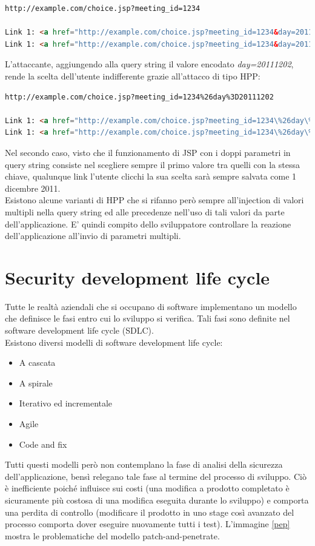 \begin{lstlisting}[language=HTML]
http://example.com/choice.jsp?meeting_id=1234

Link 1: <a href="http://example.com/choice.jsp?meeting_id=1234&day=20111201">1 dicembre 2011</a>
Link 1: <a href="http://example.com/choice.jsp?meeting_id=1234&day=20111202">2 dicembre 2011</a>
\end{lstlisting}

L'attaccante, aggiungendo alla query string il valore encodato \emph{day=20111202}, rende la scelta dell'utente indifferente grazie all'attacco di tipo HPP:\\

\begin{lstlisting}[language=HTML]
http://example.com/choice.jsp?meeting_id=1234%26day%3D20111202

Link 1: <a href="http://example.com/choice.jsp?meeting_id=1234\%26day\%3D20111202&day=20111201">1 dicembre 2011</a>
Link 1: <a href="http://example.com/choice.jsp?meeting_id=1234\%26day\%3D20111202&day=20111202">2 dicembre 2011</a>
\end{lstlisting}

Nel secondo caso, visto che il funzionamento di JSP con i doppi parametri in query string consiste nel scegliere sempre il primo valore tra quelli con la stessa chiave, qualunque link l'utente clicchi la sua scelta sarà sempre salvata come 1 dicembre 2011.\\
Esistono alcune varianti di HPP che si rifanno però sempre all'injection di valori multipli nella query string ed alle precedenze nell'uso di tali valori da parte dell'applicazione. E' quindi compito dello sviluppatore controllare la reazione dell'applicazione all'invio di parametri multipli.

\section{Security development life cycle}
Tutte le realtà aziendali che si occupano di software implementano un modello che definisce le fasi entro cui lo sviluppo si verifica. Tali fasi sono definite nel software development life cycle (SDLC).\\
Esistono diversi modelli di software development life cycle:
\begin{itemize}
\item A cascata
\item A spirale
\item Iterativo ed incrementale
\item Agile
\item Code and fix
\end{itemize}
Tutti questi modelli però non contemplano la fase di analisi della sicurezza dell'applicazione, bensì relegano tale fase al termine del processo di sviluppo. Ciò è inefficiente poiché influisce sui costi (una modifica a prodotto completato è sicuramente più costosa di una modifica eseguita durante lo sviluppo) e comporta una perdita di controllo (modificare il prodotto in uno stage così avanzato del processo comporta dover eseguire nuovamente tutti i test).
L'immagine \ref{pep} mostra le problematiche del modello patch-and-penetrate.

